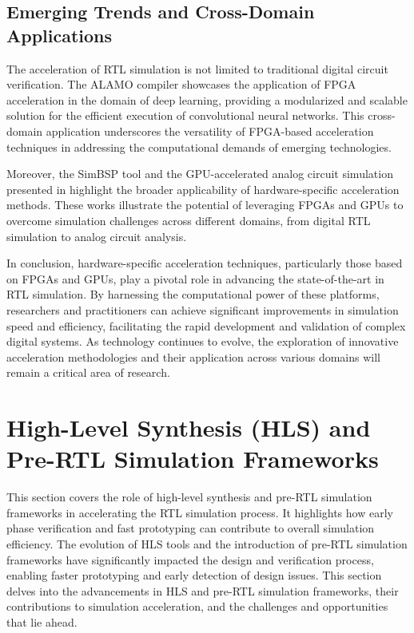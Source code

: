\documentclass[conference]{IEEEtran}
\begin{document}
\subsection{Emerging Trends and Cross-Domain Applications}

The acceleration of RTL simulation is not limited to traditional digital circuit verification. The ALAMO compiler \cite{maALAMOFPGAAcceleration2018} showcases the application of FPGA acceleration in the domain of deep learning, providing a modularized and scalable solution for the efficient execution of convolutional neural networks. This cross-domain application underscores the versatility of FPGA-based acceleration techniques in addressing the computational demands of emerging technologies.

Moreover, the SimBSP tool \cite{sanaullahSimBSPEnablingRTL} and the GPU-accelerated analog circuit simulation presented in \cite{zhaoEmpyreanALPSGTGPUaccelerated} highlight the broader applicability of hardware-specific acceleration methods. These works illustrate the potential of leveraging FPGAs and GPUs to overcome simulation challenges across different domains, from digital RTL simulation to analog circuit analysis.

In conclusion, hardware-specific acceleration techniques, particularly those based on FPGAs and GPUs, play a pivotal role in advancing the state-of-the-art in RTL simulation. By harnessing the computational power of these platforms, researchers and practitioners can achieve significant improvements in simulation speed and efficiency, facilitating the rapid development and validation of complex digital systems. As technology continues to evolve, the exploration of innovative acceleration methodologies and their application across various domains will remain a critical area of research.

\section{High-Level Synthesis (HLS) and Pre-RTL Simulation Frameworks}

This section covers the role of high-level synthesis and pre-RTL simulation frameworks in accelerating the RTL simulation process. It highlights how early phase verification and fast prototyping can contribute to overall simulation efficiency. The evolution of HLS tools and the introduction of pre-RTL simulation frameworks have significantly impacted the design and verification process, enabling faster prototyping and early detection of design issues. This section delves into the advancements in HLS and pre-RTL simulation frameworks, their contributions to simulation acceleration, and the challenges and opportunities that lie ahead.
\end{document}
